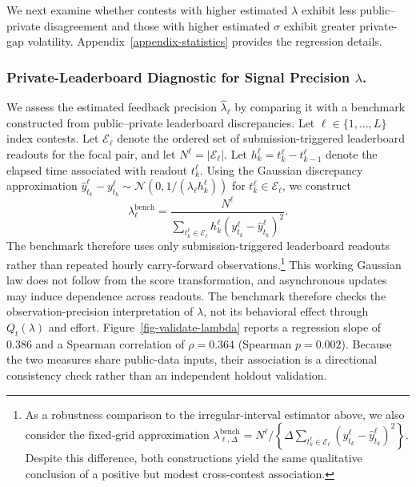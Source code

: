\documentclass[mnsc]{informs3}
\begin{document}
{We next examine whether contests with higher estimated $\lambda$ exhibit less public--private disagreement and those with higher estimated $\sigma$ exhibit greater private-gap volatility. Appendix~\ref{appendix-statistics} provides the regression details.}

\subsubsection{Private-Leaderboard Diagnostic for Signal Precision $\lambda$.}
{We assess the estimated feedback precision $\hat\lambda_\ell$ by comparing it with a benchmark constructed from public--private leaderboard discrepancies.}
Let $\ell\in\{1,\ldots,L\}$ index contests.
Let $\mathcal E_\ell$ denote the ordered set of submission-triggered leaderboard readouts for the focal pair, and let $N^\ell=|\mathcal E_\ell|$.
Let $h_k^\ell=t_k^\ell-t_{k-1}^\ell$ denote the elapsed time associated with readout $t_k^\ell$.
{Using the Gaussian discrepancy approximation $\hat y_{t_k}^\ell-y_{t_k}^\ell\sim\mathcal N\!\left(0,1/(\lambda_\ell h_k^\ell)\right)$ for $t_k^\ell\in\mathcal E_\ell$, we construct}
\begin{equation*}
\lambda^{\text{bench}}_\ell =
\frac{N^\ell}
{\sum_{t_k^\ell\in\mathcal E_\ell}
h_k^\ell (y_{t_k}^\ell - \hat{y}_{t_k}^\ell)^2}.
\end{equation*}
The benchmark therefore uses only submission-triggered leaderboard readouts rather than repeated hourly carry-forward observations.\footnote{
As a robustness comparison to the irregular-interval estimator above, we also consider the fixed-grid approximation $\lambda_{\ell,\Delta}^{\mathrm{bench}}=N^\ell/\left\{\Delta\sum_{t_k^\ell\in\mathcal E_\ell}(y_{t_k}^\ell-\hat y_{t_k}^\ell)^2\right\}$. 
Despite this difference, both constructions yield the same qualitative conclusion of a positive but modest cross-contest association.
}
{This working Gaussian law does not follow from the score transformation, and asynchronous updates may induce dependence across readouts. The benchmark therefore checks the observation-precision interpretation of $\lambda$, not its behavioral effect through $Q_t(\lambda)$ and effort.}
Figure~\ref{fig-validate-lambda} reports a regression slope of $0.386$ and a Spearman correlation of $\rho=0.364$ (Spearman $p=0.002$). Because the two measures share public-data inputs, their association is a directional consistency check rather than an independent holdout validation.
\end{document}
